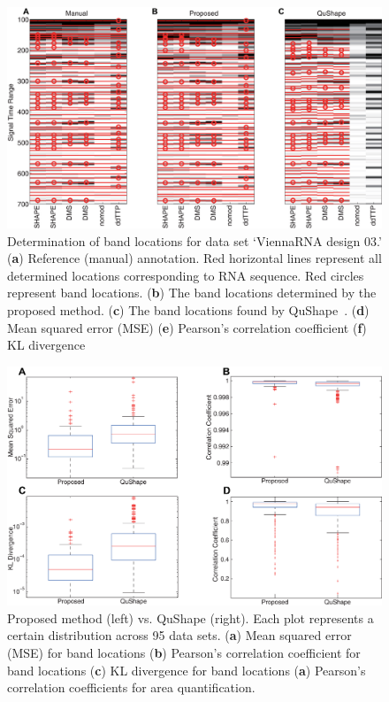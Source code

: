 \begin{figure}
\centering
\includegraphics[width=0.9\linewidth]{figures/result_band_assign6}
\caption{Determination of band locations for data set `ViennaRNA design 03.' (\textbf{a}) Reference (manual) annotation. Red horizontal lines represent all determined locations corresponding to RNA sequence. Red circles represent band locations. (\textbf{b}) The band locations determined by the proposed method. (\textbf{c}) The band locations found by QuShape~\citep{Karabiber2013}. (\textbf{d}) Mean squared error (MSE) (\textbf{e}) Pearson's correlation coefficient (\textbf{f}) KL divergence}
\label{f:band-assign}
\end{figure}

\begin{figure}
\centering
\includegraphics[width=0.9\linewidth]{figures/boxplots}
\caption{Proposed method (left) vs. QuShape (right). Each plot represents a certain distribution across 95 data sets. (\textbf{a}) Mean squared error (MSE) for band locations (\textbf{b}) Pearson's correlation coefficient for band locations (\textbf{c}) KL divergence for band locations (\textbf{a}) Pearson's correlation coefficients for area quantification.}
\label{f:boxplots}
\end{figure}


